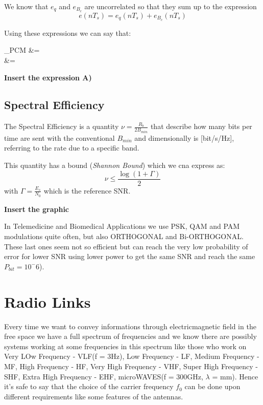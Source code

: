 We know that $e_q$ and $e_{B_c}$ are uncorrelated so that they sum up to the expression
\begin{equation}
e(nT_s) = e_q(nT_s) + e_{B_c}(nT_s)
\end{equation}

Using these expressions we can say that:
\begin{esp}
 \Gamma_{PCM} &=  \\&= 
\end{esp}

\textbf{Insert the expression A)}

\subsection{Spectral Efficiency}
The Spectral Efficiency is a quantity $\nu = \frac{R_b}{2B_{min}}$ that describe how many bits per time are sent with the conventional $B_{min}$ and dimensionally is [bit/s/Hz], referring to the rate due to a specific band.

This quantity has a bound (\textit{Shannon Bound}) which we cna express as:
\begin{equation}
\nu \leq \frac{\log (1 + \Gamma)}{2}
\end{equation}
with $\Gamma = \frac{E_s}{N_0}$ which is the reference SNR.

\textbf{Insert the graphic}

In Telemedicine and Biomedical Applications we use PSK, QAM and PAM modulations quite often, but also ORTHOGONAL and Bi-ORTHOGONAL. These last ones seem not so efficient but can reach the very low probability of error for lower SNR using lower power to get the same SNR and reach the same $P_{bit} = 10^-6$).

\section{Radio Links}
Every time we want to convey informations through electricmagnetic field in the free space we have a full spectrum of frequencies and we know there are possibly systems working at some frequencies in this spectrum like those who work on Very LOw Frequency - VLF(f = 3Hz), Low Frequency - LF, Medium Frequency - MF, High Frequency - HF, Very High Frequency - VHF, Super High Frequency - SHF, Extra High Frequency - EHF, microWAVES(f = 300GHz, $\lambda$ = mm).
Hence it's safe to say that the choice of the carrier frequency $f_0$ can be done upon different requirements like some features of the antennas.

